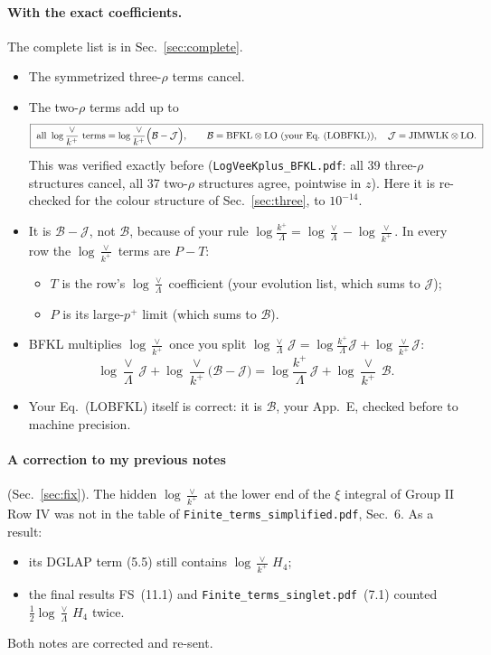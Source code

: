 \documentclass[10pt]{article}
\numberwithin{equation}{section}
\newcommand{\JJ}{\mathcal J}
\newcommand{\BB}{\mathcal B}
\begin{document}
\paragraph{With the exact coefficients.} The complete list is in Sec.~\ref{sec:complete}.
\begin{itemize}
\item The symmetrized three-$\rho$ terms cancel.
\item The two-$\rho$ terms add up to
\begin{equation}
\boxed{\ \text{all }\log\frac{\vee}{k^+}\text{ terms}=\log\frac{\vee}{k^+}\Big(\BB-\JJ\Big),\qquad\BB={\rm BFKL}\otimes{\rm LO}\ \text{(your Eq.~(LOBFKL))},\quad\JJ={\rm JIMWLK}\otimes{\rm LO}.\ }
\label{eq:main}
\end{equation}
This was verified exactly before (\texttt{LogVeeKplus\_BFKL.pdf}: all 39 three-$\rho$ structures cancel, all 37 two-$\rho$ structures agree, pointwise in $z$). Here it is re-checked for the colour structure of Sec.~\ref{sec:three}, to $10^{-14}$.
\item It is $\BB-\JJ$, not $\BB$, because of your rule $\log\frac{k^+}{\Lambda}=\log\frac\vee\Lambda-\log\frac{\vee}{k^+}$. In every row the $\log\frac{\vee}{k^+}$ terms are $P-T$:
\begin{itemize}
\item $T$ is the row's $\log\frac\vee\Lambda$ coefficient (your evolution list, which sums to $\JJ$);
\item $P$ is its large-$p^+$ limit (which sums to $\BB$).
\end{itemize}
\item BFKL multiplies $\log\frac{\vee}{k^+}$ once you split $\log\frac\vee\Lambda\,\JJ=\log\frac{k^+}{\Lambda}\JJ+\log\frac{\vee}{k^+}\JJ$:
\begin{equation}
\log\frac{\vee}{\Lambda}\,\JJ+\log\frac{\vee}{k^+}\big(\BB-\JJ\big)=\log\frac{k^+}{\Lambda}\,\JJ+\log\frac{\vee}{k^+}\,\BB.
\end{equation}
\item Your Eq.~(LOBFKL) itself is correct: it is $\BB$, your App.~E, checked before to machine precision.
\end{itemize}

\paragraph{A correction to my previous notes} (Sec.~\ref{sec:fix}). The hidden $\log\frac{\vee}{k^+}$ at the lower end of the $\xi$ integral of Group II Row IV was not in the table of \texttt{Finite\_terms\_simplified.pdf}, Sec.~6. As a result:
\begin{itemize}
\item its DGLAP term (5.5) still contains $\log\frac{\vee}{k^+}\,H_4$;
\item the final results FS~(11.1) and \texttt{Finite\_terms\_singlet.pdf}~(7.1) counted $\frac12\log\frac\vee\Lambda\,H_4$ twice.
\end{itemize}
Both notes are corrected and re-sent.
\end{document}
